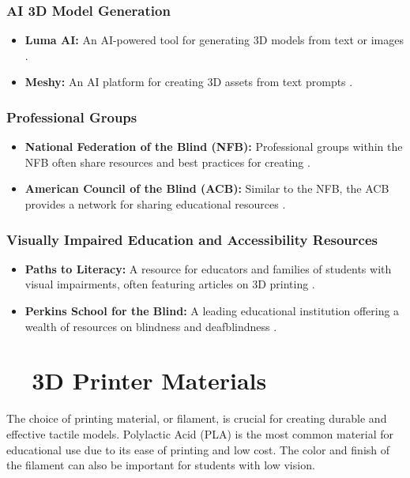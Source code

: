 \subsubsection{AI 3D Model Generation}
\begin{itemize}
	\item \textbf{Luma AI:} An AI-powered tool for generating 3D models from text or images \supercite{LumaAI}.
	\item \textbf{Meshy:} An AI platform for creating 3D assets from text prompts \supercite{Meshy}.
\end{itemize}

\subsubsection{Professional Groups}
\begin{itemize}
	\item \textbf{National Federation of the Blind (NFB):} Professional groups within the NFB often share resources and best practices for creating  \supercite{NFB}.
	\item \textbf{American Council of the Blind (ACB):} Similar to the NFB, the ACB provides a network for sharing educational resources \supercite{ACB}.
\end{itemize}

\subsubsection{Visually Impaired Education and Accessibility Resources}
\begin{itemize}
	\item \textbf{Paths to Literacy:} A resource for educators and families of students with visual impairments, often featuring articles on 3D printing \supercite{PathsToLiteracy}.
	\item \textbf{Perkins School for the Blind:} A leading educational institution offering a wealth of resources on blindness and deafblindness \supercite{Perkins}.
\end{itemize}

\section{~~3D Printer Materials}\label{ch5:sec:materials}
The choice of printing material, or filament, is crucial for creating durable and effective tactile models. Polylactic Acid (PLA) is the most common material for educational use due to its ease of printing and low cost. The color and finish of the filament can also be important for students with low vision.\supercite{FilamentColors, Pantone}


